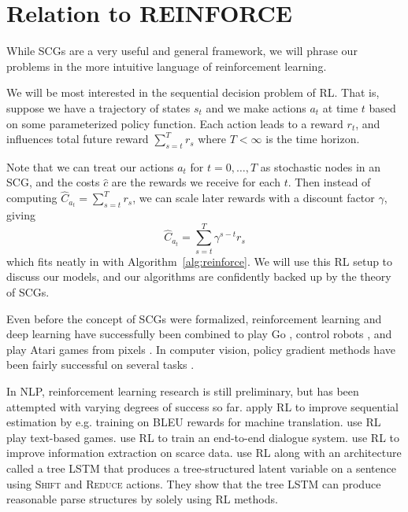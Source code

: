 \documentclass[12pt]{report}
\begin{document}




\section{Relation to REINFORCE}

While SCGs are a very useful and general framework, we will phrase our problems in the more intuitive language of reinforcement learning.

We will be most interested in the sequential decision problem of RL. That is, suppose we have a trajectory of states $s_t$ and we make actions $a_t$ at time $t$ based on some parameterized policy function. Each action leads to a reward $r_t$, and influences total future reward $\sum_{s=t}^T r_s$ where $T < \infty$ is the time horizon.

Note that we can treat our actions $a_t$ for $ t = 0, \ldots, T$ as stochastic nodes in an SCG, and the costs $\hat{c}$ are the rewards we receive for each $t$. Then instead of computing $\hat{C}_{a_t} = \sum_{s=t}^T r_s$, we can scale later rewards with a discount factor $\gamma $, giving
\begin{equation}
\hat{C}_{a_t} = \sum_{s=t}^T \gamma^{s-t} r_s
\end{equation}
which fits neatly in with Algorithm~\ref{alg:reinforce}. We will use this RL setup to discuss our models, and our algorithms are confidently backed up by the theory of SCGs.




Even before the concept of SCGs were formalized, reinforcement learning and deep learning have successfully been combined to play Go \citep{Silver2016}, 
control robots \citep{Levine2016}, and play Atari games from pixels \citep{deepatari2015}.
In computer vision, policy gradient methods have been fairly successful on several tasks
\citep{mnih2014visualattention, ba2015visualattention, xu2015captioning}.

In NLP, reinforcement learning research is still preliminary, but has been attempted with varying degrees of success so far.
\citet{ranzato2015} apply RL to improve sequential estimation by e.g. training on BLEU rewards for machine translation.
\citet{Narasimhan2015} use RL play text-based games.
\citet{li2016dialogueRL} use RL to train an end-to-end dialogue system.
\citet{narasimhan2016} use RL to improve information extraction on scarce data.
\citet{Yogatama2017} use RL along with an architecture called a tree LSTM that produces a tree-structured latent variable on a sentence using \textsc{Shift} and \textsc{Reduce} actions. They show that the tree LSTM can produce reasonable parse structures by solely using RL methods.
\end{document}
